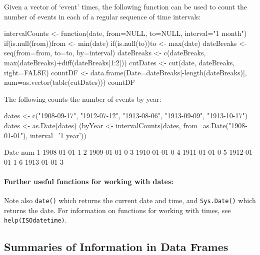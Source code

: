 \documentclass{tufte-book}\usepackage[]{graphicx}\usepackage[]{color}
\newcommand{\txtt}[1]{\texttt{#1}}
\newcommand{\margtt}[1]{{\footnotesize \texttt{#1}}}
\begin{document}
Given a vector of `event' times, the following function can be used to
count the number of events in each of a regular sequence of time
intervals:
\begin{fullwidth}

\begin{Schunk}
\begin{Sinput}
intervalCounts <- function(date, from=NULL, to=NULL, interval="1 month"){
  if(is.null(from))from <- min(date)
  if(is.null(to))to <- max(date)
  dateBreaks <- seq(from=from, to=to, by=interval)
  dateBreaks <- c(dateBreaks, max(dateBreaks)+diff(dateBreaks[1:2]))
  cutDates <- cut(date, dateBreaks, right=FALSE)
  countDF <- data.frame(Date=dateBreaks[-length(dateBreaks)],
                        num=as.vector(table(cutDates)))
  countDF
}
\end{Sinput}
\end{Schunk}

\end{fullwidth}

The following counts the number of events by year:
\begin{fullwidth}
\small

\begin{Schunk}
\begin{Sinput}
dates <- c("1908-09-17", "1912-07-12", "1913-08-06", "1913-09-09", "1913-10-17")
dates <- as.Date(dates)
(byYear <- intervalCounts(dates, from=as.Date("1908-01-01"), interval='1 year'))
\end{Sinput}
\begin{Soutput}
        Date num
1 1908-01-01   1
2 1909-01-01   0
3 1910-01-01   0
4 1911-01-01   0
5 1912-01-01   1
6 1913-01-01   3
\end{Soutput}
\end{Schunk}

\end{fullwidth}

\paragraph{Further useful functions for working with dates:}
Note
 also \txtt{date()}
which returns the current date and time, and \txtt{Sys.Date()} which
returns the date.  For information on functions for working with
times, see \margtt{help(ISOdatetime)}.

\subsection{Summaries of Information in Data Frames}
\end{document}
